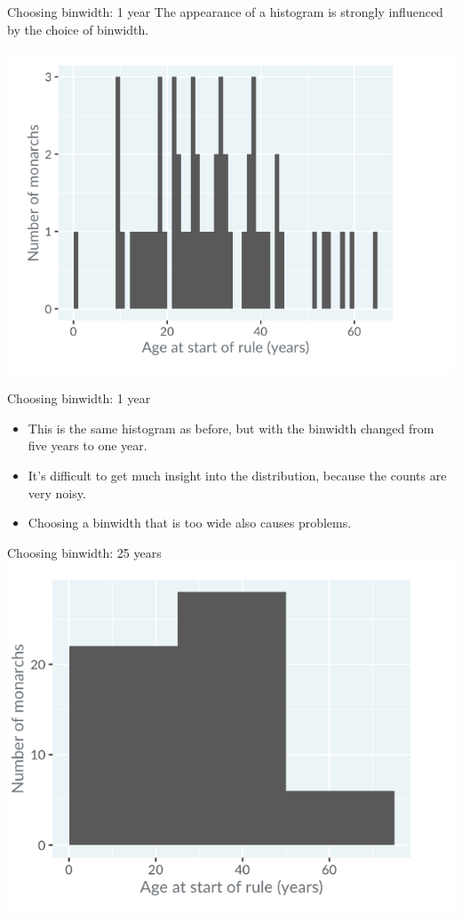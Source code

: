 \documentclass[
  ignorenonframetext,
]{beamer}
\begin{document}
\begin{frame}{Choosing binwidth: 1 year}
\label{choosing-binwidth-1-year}
The appearance of a histogram is strongly influenced by the choice of
binwidth.

\includegraphics{../images/im8.png}
\end{frame}

\begin{frame}{Choosing binwidth: 1 year}
\label{choosing-binwidth-1-year-1}
\begin{itemize}
\item
  This is the same histogram as before, but with the binwidth changed
  from five years to one year.
\item
  It's difficult to get much insight into the distribution, because the
  counts are very noisy.
\item
  Choosing a binwidth that is too wide also causes problems.
\end{itemize}
\end{frame}

\begin{frame}{Choosing binwidth: 25 years}
\label{choosing-binwidth-25-years}
\includegraphics{../images/im9.png}
\end{frame}
\end{document}
